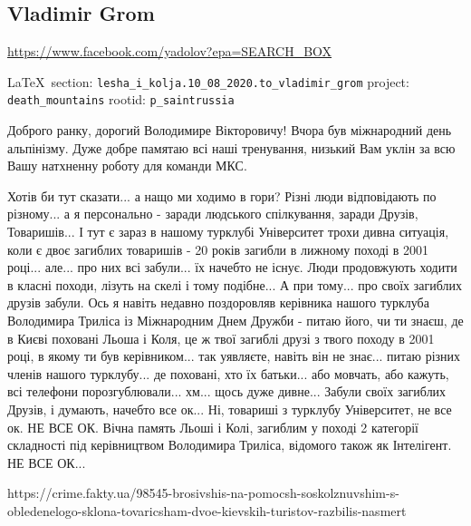  
 
\subsection{Vladimir Grom}
\url{https://www.facebook.com/yadolov?epa=SEARCH_BOX}
  
\vspace{0.5cm}
 {\ifDEBUG\small\LaTeX~section: \verb|lesha_i_kolja.10_08_2020.to_vladimir_grom| project: \verb|death_mountains| rootid: \verb|p_saintrussia| \fi}
\vspace{0.5cm}
  
Доброго ранку, дорогий Володимире Вікторовичу! Вчора був міжнародний день
альпінізму.  Дуже добре памятаю всі наші тренування, низький Вам уклін за всю
Вашу натхненну роботу для команди МКС.

Хотів би тут сказати... а нащо ми
ходимо в гори? Різні люди відповідають по різному... а я персонально - заради
людського спілкування, заради Друзів, Товаришів... І тут є зараз в нашому
турклубі Університет трохи дивна ситуація, коли є двоє загиблих товаришів - 20
років загибли в лижному поході в 2001 році... але... про них всі забули... їх
начебто не існує. Люди продовжують ходити в класні походи, лізуть на скелі і
тому подібне... А при тому... про своїх загиблих друзів забули. Ось я навіть
недавно поздоровляв керівника нашого турклуба Володимира Триліса із Міжнародним
Днем Дружби - питаю його, чи ти знаєш, де в Києві поховані Льоша і Коля, це ж
твої загиблі друзі з твого походу в 2001 році, в якому ти був керівником... так
уявляєте, навіть він не знає... питаю різних членів нашого турклубу... де
поховані, хто їх батьки... або мовчать, або кажуть, всі телефони
порозгублювали... хм... щось дуже дивне... Забули своїх загиблих Друзів, і
думають, начебто все ок... Ні, товариші з турклубу Університет, не все ок. НЕ
ВСЕ ОК. Вічна память Льоші і Колі, загиблим у поході 2 категорії складності під
керівництвом Володимира Триліса, відомого також як Інтелігент. НЕ ВСЕ ОК...

https://crime.fakty.ua/98545-brosivshis-na-pomocsh-soskolznuvshim-s-obledenelogo-sklona-tovaricsham-dvoe-kievskih-turistov-razbilis-nasmert
  
